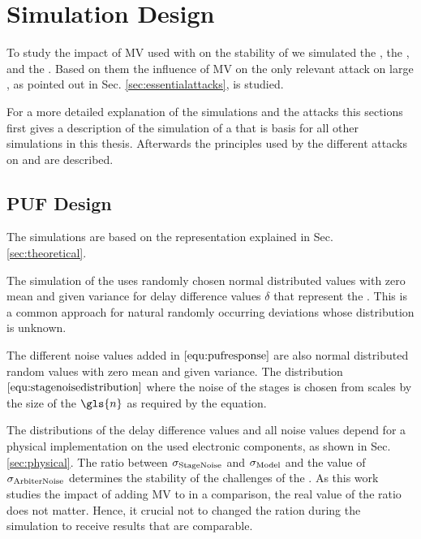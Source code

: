 \chapter{Simulation Design}
\label{cap:simulationdesign}

To study the impact of \ac{MV} used with \apufs on the stability of \apuf we simulated the \apuf, the \mpuf, and the \mxpuf.
Based on them the influence of \ac{MV} on the only relevant attack on large \xpufs, as pointed out in Sec. \ref{sec:essentialattacks}, is studied.


For a more detailed explanation of the simulations and the attacks this sections first gives a description of the simulation of a \apuf that is basis for all other \puf simulations in this thesis.
Afterwards the principles used by the different attacks on \mpufs and \mxpufs are described.



\section{\ac{PUF} Design}
\label{sec:pufsimulation}

The \apuf simulations are based on the \apuf representation explained in Sec. \ref{sec:theoretical}.

The simulation of the \apuf uses randomly chosen normal distributed values with zero mean and given variance for delay difference values $\delta$ that represent the \apuf.
This is a common approach for natural randomly occurring deviations whose distribution is unknown. %

The different noise values added in $\ref{equ:pufresponse}$ are also normal distributed random values with zero mean and given variance.
The distribution $\ref{equ:stagenoisedistribution}$ where the noise of the stages is chosen from scales by the size of the \apuf $\gls{n}$ as required by the equation.

The distributions of the delay difference values and all noise values depend for a physical \apuf implementation on the used electronic components, as shown in Sec. \ref{sec:physical}. %
The ratio between $\sigma_{\mathrm{Stage Noise}}$ and $\sigma_{\mathrm{Model}}$ and the value of $\sigma_{\mathrm{Arbiter Noise}}$ determines the stability of the challenges of the \apuf.
As this work studies the impact of adding \ac{MV} to \apufs in a comparison, the real value of the ratio does not matter.
Hence, it crucial not to changed the ration during the simulation to receive results that are comparable.

